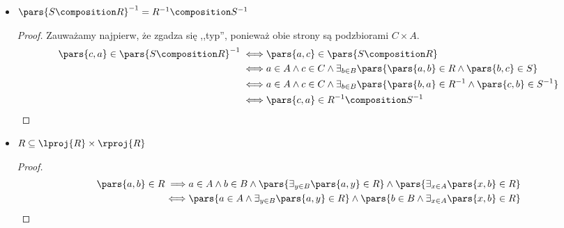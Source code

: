 \begin{description}
\begin{itemize}
\begin{proof}
\begin{equation*}
\begin{split}
					                 & \land \exists_{b \in B} \pars{\pars{a, b} \in R \land \pars{\exists_{c \in C} \pars{\pars{b, c} \in S \land \pars{c, d} \in T}}} \\
					            \iff & a \in A \land d \in D \land \exists_{b \in B} \pars{\pars{a, b} \in R \land \pars{b, d} \in T \composition S}                    \\
					            \iff & \pars{a, d} \in \pars{T \composition S} \composition R
				            \end{split}
			            \end{equation*}
		            \end{proof}
		      \item \(\pars{S \composition R}^{-1} = R^{-1} \composition S^{-1}\)
		            \begin{proof}
			            Zauważamy najpierw, że zgadza się ,,typ'', ponieważ obie strony są podzbiorami \(C \times A\).
			            \begin{equation*}
				            \begin{split}
					            \pars{c, a} \in \pars{S \composition R}^{-1}
					            \iff & \pars{a, c} \in \pars{S \composition R}                                                                  \\
					            \iff & a \in A \land c \in C \land \exists_{b \in B} \pars{\pars{a, b} \in R \land \pars{b, c} \in S}           \\
					            \iff & a \in A \land c \in C \land \exists_{b \in B} \pars{\pars{b, a} \in R^{-1} \land \pars{c, b} \in S^{-1}} \\
					            \iff & \pars{c, a} \in R^{-1} \composition S^{-1}
				            \end{split}
			            \end{equation*}
		            \end{proof}
		      \item \(R \subseteq \lproj{R} \times \rproj{R}\)
		            \begin{proof}
			            \begin{equation*}
				            \begin{split}
					            \pars{a, b} \in R
					            \implies & a \in A \land b \in B \land \pars{\exists_{y \in B} \pars{a, y} \in R} \land \pars{\exists_{x \in A} \pars{x, b} \in R} \\
					            \iff     & \pars{a \in A \land \exists_{y \in B} \pars{a, y} \in R} \land \pars{b \in B \land \exists_{x \in A} \pars{x, b} \in R} \\

\end{split}
\end{equation*}
\end{proof}
\end{itemize}
\end{description}
